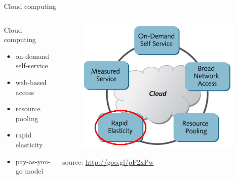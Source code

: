 \begin{frame}{Cloud computing}
	{
		\begin{columns}
			\begin{column}{0.5\textwidth}
				Cloud computing
				\begin{itemize}
					\item{\footnotesize{on-demand self-service}}
					\item{\footnotesize{web-based access}}
					\item{\footnotesize{resource pooling}}
					\item{\footnotesize{rapid elasticity}}
					\item{\footnotesize{pay-as-you-go model}}
				\end{itemize}
			\end{column}
			\begin{column}{0.5\textwidth}
				\begin{figure}
					\centering{}
					\includegraphics[scale=0.25]{images/cloud-characteristics-selected.png}
				\end{figure}
				\begin{flushright}
					\tiny{source: \url{http://goo.gl/pF2xPw}}
				\end{flushright}
			\end{column}
		\end{columns}
	}
\end{frame}


